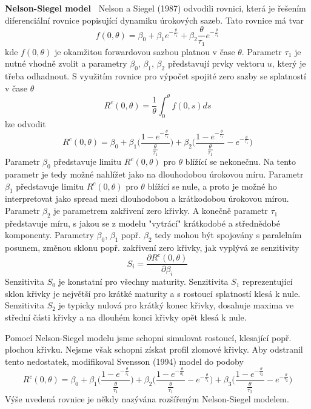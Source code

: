\documentclass[a4paper]{book}
\begin{document}
\noindent \textbf{Nelson-Siegel model~} Nelson a Siegel (1987) odvodili rovnici, která je řešením diferenciální rovnice popisující dynamiku úrokových sazeb. Tato rovnice má tvar
\begin{equation*}
f(0, \theta) = \beta_0 + \beta_1 e^{-\frac{\theta}{\tau_1}} + \beta_2 \frac{\theta}{\tau_1}e^{-\frac{\theta}{\tau_1}}
\end{equation*}
kde $f(0, \theta)$ je okamžitou forwardovou sazbou platnou v čase $\theta$. Parametr $\tau_1$ je nutné vhodně zvolit a parametry $\beta_0$, $\beta_1$, $\beta_2$ představují prvky vektoru $u$, který je třeba odhadnout. S využitím rovnice pro výpočet spojité zero sazby se splatností v čase $\theta$ 
\begin{equation*}
R^c(0,\theta) = \frac{1}{\theta} \int_0^{\theta} f(0,s)ds
\end{equation*}
lze odvodit
\begin{equation*}
R^c(0, \theta) = \beta_0 + \beta_1 \Bigg( \frac{1 - e^{-\frac{\theta}{\tau_1}}}{\frac{\theta}{\tau_1}}\Bigg) + \beta_2 \Bigg( \frac{1 - e^{-\frac{\theta}{\tau_1}}}{\frac{\theta}{\tau_1}} - e^{-\frac{\theta}{\tau_1}} \Bigg)
\end{equation*}
Parametr $\beta_0$ představuje limitu $R^c(0, \theta)$ pro $\theta$ blížící se nekonečnu. Na tento parametr je tedy možné nahlížet jako na dlouhodobou úrokovou míru. Parametr $\beta_1$ představuje limitu $R^c(0, \theta)$ pro $\theta$ blížící se nule, a proto je možné ho interpretovat jako spread mezi dlouhodobou a krátkodobou úrokovou mírou. Parametr $\beta_2$ je parametrem zakřivení zero křivky. A konečně parametr $\tau_1$ představuje míru, s jakou se z modelu "vytrácí" krátkodobé a střednědobé komponenty. Parametry $\beta_0$, $\beta_1$ popř. $\beta_2$ tedy mohou být spojovány s paralelním posunem, změnou sklonu popř. zakřivení zero křivky, jak vyplývá ze senzitivity
\begin{equation*}
S_i = \frac{\partial R^c(0, \theta)}{\partial \beta_i}
\end{equation*}
Senzitivita $S_0$ je konstatní pro všechny maturity. Senzitivita $S_1$ reprezentující sklon křivky je největší pro krátké maturity a s rostoucí splatností klesá k nule. Senzitivita $S_2$ je typicky nulová pro krátký konec křivky, dosahuje maxima ve střední části křivky a na dlouhém konci křivky opět klesá k nule.

Pomocí Nelson-Siegel modelu jsme schopni simulovat rostoucí, klesající popř. plochou křivku. Nejsme však schopni získat profil zlomové křivky. Aby odstranil tento nedostatek, modifikoval Svensson (1994) model do podoby
\begin{equation*}
R^c(0, \theta) = \beta_0 + \beta_1 \Bigg( \frac{1 - e^{-\frac{\theta}{\tau_1}}}{\frac{\theta}{\tau_1}} \Bigg) + \beta_2 \Bigg( \frac{1 - e^{-\frac{\theta}{\theta_1}}}{\frac{\theta}{\tau_1}} - e^{-\frac{\theta}{\tau_1}}\Bigg) + \beta_3 \Bigg( \frac{1 - e^{-\frac{\theta}{\tau_2}}}{\frac{\theta}{\tau_2}} - e^{-\frac{\theta}{\tau_2}}\Bigg)
\end{equation*}
Výše uvedená rovnice je někdy nazývána rozšířeným Nelson-Siegel modelem.\\
\end{document}
